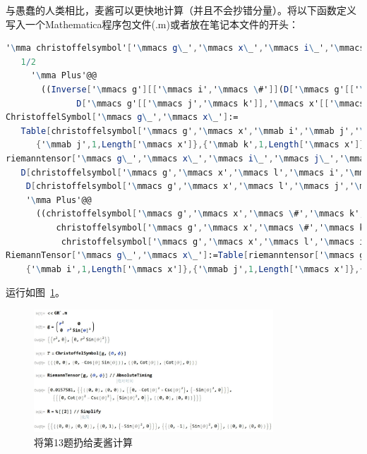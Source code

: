 \begin{xiti}
\begin{jie}
		与愚蠢的人类相比，麦酱可以更快地计算（并且不会抄错分量）。将以下函数定义写入一个Mathematica程序包文件(.m)或者放在笔记本文件的开头：
		\begin{lstlisting}[language=Mathematica]
'\mma christoffelsymbol'['\mmacs g\_','\mmacs x\_','\mmacs i\_','\mmacs j\_','\mmacs k\_']:=
   1/2
     '\mma Plus'@@
       ((Inverse['\mmacs g'][['\mmacs i','\mmacs \#']](D['\mmacs g'[['\mmacs \#','\mmacs j']],'\mmacs x'[['\mmacs k']]]+D['\mmacs g'[['\mmacs k','\mmacs \#']],'\mmacs x'[['\mmacs j']]]-
              D['\mmacs g'[['\mmacs j','\mmacs k']],'\mmacs x'[['\mmacs \#']]]))&)/@'\mma Range'[Length['\mmacs x']];
ChristoffelSymbol['\mmacs g\_','\mmacs x\_']:=
   Table[christoffelsymbol['\mmacs g','\mmacs x','\mmab i','\mmab j','\mmab k'],{'\mmab i',1,Length['\mmacs x']},
      {'\mmab j',1,Length['\mmacs x']},{'\mmab k',1,Length['\mmacs x']}];
riemanntensor['\mmacs g\_','\mmacs x\_','\mmacs i\_','\mmacs j\_','\mmacs k\_','\mmacs l\_']:=
   D[christoffelsymbol['\mmacs g','\mmacs x','\mmacs l','\mmacs i','\mmacs k'],'\mmacs x'[['\mmacs j']]]-
    D[christoffelsymbol['\mmacs g','\mmacs x','\mmacs l','\mmacs j','\mmacs k'],'\mmacs x'[['\mmacs i']]]+
    '\mma Plus'@@
      ((christoffelsymbol['\mmacs g','\mmacs x','\mmacs \#','\mmacs k','\mmacs i'] christoffelsymbol['\mmacs g','\mmacs x','\mmacs l','\mmacs j','\mmacs \#']-
          christoffelsymbol['\mmacs g','\mmacs x','\mmacs \#','\mmacs k','\mmacs j']
           christoffelsymbol['\mmacs g','\mmacs x','\mmacs l','\mmacs i','\mmacs \#'])&)/@Range[Length['\mmacs x']];
RiemannTensor['\mmacs g\_','\mmacs x\_']:=Table[riemanntensor['\mmacs g','\mmacs x','\mmab i','\mmab j','\mmab k','\mmab l'],
    {'\mmab i',1,Length['\mmacs x']},{'\mmab j',1,Length['\mmacs x']},{'\mmab k',1,Length['\mmacs x']},{'\mmab l',1,Length['\mmacs x']}];
		\end{lstlisting}
		运行如图~\ref{f3.1}。
		\begin{figure}[htb]
			\centering
			\includegraphics[width=0.8\textwidth]{chapters/1}
			\caption{将第13题扔给麦酱计算}\label{f3.1}
		\end{figure}
	\end{jie}
	

\end{xiti}
